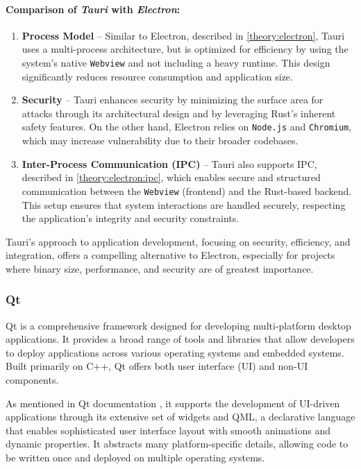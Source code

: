 \paragraph{Comparison of \textit{Tauri} with \textit{Electron}:}
\begin{enumerate}
    \item \textbf{Process Model} -- Similar to Electron, described in \ref{theory:electron}, Tauri uses a multi-process architecture, but is optimized for efficiency by using the system's native \texttt{Webview} and not including a heavy runtime. This design significantly reduces resource consumption and application size.

    \item \textbf{Security} -- Tauri enhances security by minimizing the surface area for attacks through its architectural design and by leveraging Rust’s inherent safety features. On the other hand, Electron relies on \texttt{Node.js} and \texttt{Chromium}, which may increase vulnerability due to their broader codebases.

    \item \textbf{Inter-Process Communication (IPC)} -- Tauri also supports IPC, described in \ref{theory:electron:ipc}, which enables secure and structured communication between the \texttt{Webview} (frontend) and the Rust-based backend. This setup ensures that system interactions are handled securely, respecting the application's integrity and security constraints.
\end{enumerate}

Tauri's approach to application development, focusing on security, efficiency, and integration, offers a compelling alternative to Electron, especially for projects where binary size, performance, and security are of greatest importance.

\subsubsection{Qt}
Qt is a comprehensive framework designed for developing multi-platform desktop applications. It provides a broad range of tools and libraries that allow developers to deploy applications across various operating systems and embedded systems. Built primarily on C++, Qt offers both user interface (UI) and non-UI components.

As mentioned in Qt documentation \cite{QtIntro}, it supports the development of UI-driven applications through its extensive set of widgets and QML, a declarative language that enables sophisticated user interface layout with smooth animations and dynamic properties. It abstracts many platform-specific details, allowing code to be written once and deployed on multiple operating systems.

